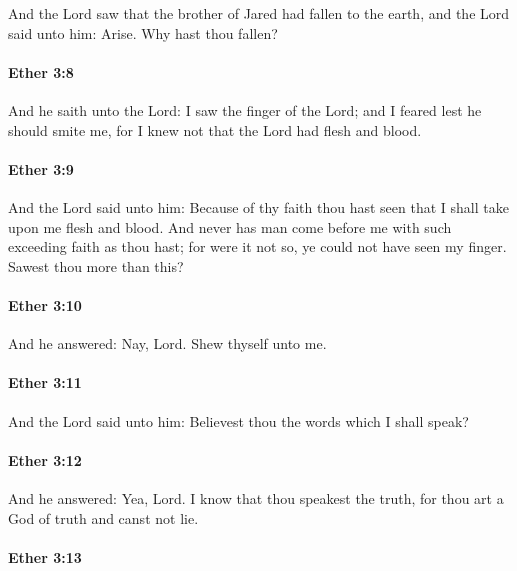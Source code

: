 			And the Lord saw that the brother of Jared had fallen to the earth,
			and the Lord said unto him: Arise.
			Why hast thou fallen?

		\paragraph{Ether 3:8} %
			\label{ETHER-3-8}

			And he saith unto the Lord:
			I saw the finger of the Lord;
			and I feared lest he should smite me,
			for I knew not that the Lord had flesh and blood.

		\paragraph{Ether 3:9} %
			\label{ETHER-3-9}

			And the Lord said unto him:
			Because of thy faith thou hast seen
			that I shall take upon me flesh and blood.
			And never has man come before me with such exceeding faith as thou hast;
			for were it not so, ye could not have seen my finger.
			Sawest thou more than this?

		\paragraph{Ether 3:10} %
			\label{ETHER-3-10}

			And he answered: Nay, Lord.
			Shew thyself unto me.

		\paragraph{Ether 3:11} %
			\label{ETHER-3-11}

			And the Lord said unto him:
			Believest thou the words which I shall speak?

		\paragraph{Ether 3:12} %
			\label{ETHER-3-12}

			And he answered: Yea, Lord.
			I know that thou speakest the truth,
			for thou art a God of truth and canst not lie.

		\paragraph{Ether 3:13} %
			\label{ETHER-3-13}

